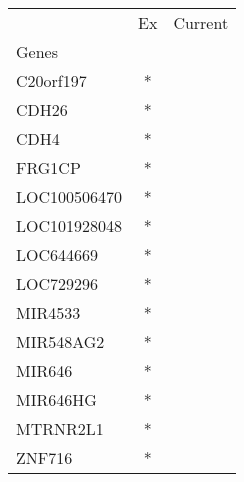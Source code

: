 \begin{tabular}{lcc}
\toprule
{} & Ex & Current \\
Genes        &    &         \\
\midrule
C20orf197    &  * &         \\
CDH26        &  * &         \\
CDH4         &  * &         \\
FRG1CP       &  * &         \\
LOC100506470 &  * &         \\
LOC101928048 &  * &         \\
LOC644669    &  * &         \\
LOC729296    &  * &         \\
MIR4533      &  * &         \\
MIR548AG2    &  * &         \\
MIR646       &  * &         \\
MIR646HG     &  * &         \\
MTRNR2L1     &  * &         \\
ZNF716       &  * &         \\
\bottomrule
\end{tabular}
